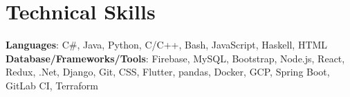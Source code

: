 \documentclass[letterpaper,11pt]{article}
\begin{document}
%
\section{Technical Skills}
 \begin{itemize}[leftmargin=0.15in, label={}]
    \small{\item{
     \textbf{Languages}{: C\#, Java, Python, C/C++, Bash, JavaScript, Haskell, HTML} \\
     \textbf{Database/Frameworks/Tools}{: Firebase, MySQL, Bootstrap, Node.js, React, Redux, .Net, Django, Git, CSS, Flutter, pandas, Docker, GCP, Spring Boot, GitLab CI, Terraform} \\
    }}
 \end{itemize}


\end{document}
